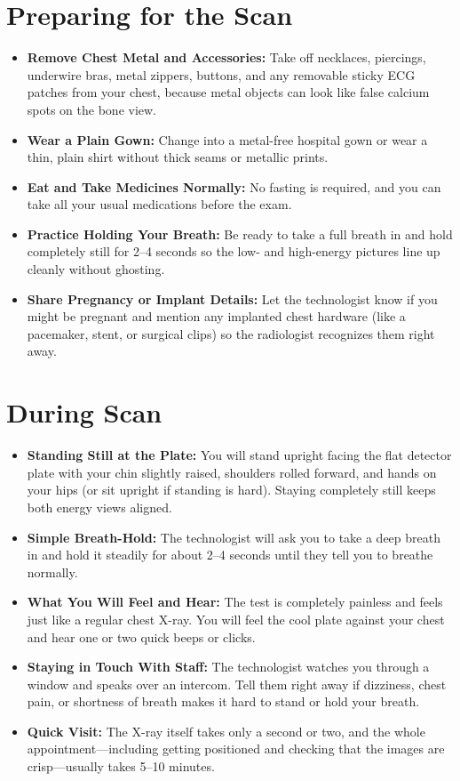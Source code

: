 \section{Preparing for the Scan}
\begin{itemize}
    \item \textbf{Remove Chest Metal and Accessories:} Take off necklaces, piercings, underwire bras, metal zippers, buttons, and any removable sticky ECG patches from your chest, because metal objects can look like false calcium spots on the bone view.
    \item \textbf{Wear a Plain Gown:} Change into a metal-free hospital gown or wear a thin, plain shirt without thick seams or metallic prints.
    \item \textbf{Eat and Take Medicines Normally:} No fasting is required, and you can take all your usual medications before the exam.
    \item \textbf{Practice Holding Your Breath:} Be ready to take a full breath in and hold completely still for 2--4 seconds so the low- and high-energy pictures line up cleanly without ghosting.
    \item \textbf{Share Pregnancy or Implant Details:} Let the technologist know if you might be pregnant and mention any implanted chest hardware (like a pacemaker, stent, or surgical clips) so the radiologist recognizes them right away.
\end{itemize}

\section{During Scan}
\begin{itemize}
    \item \textbf{Standing Still at the Plate:} You will stand upright facing the flat detector plate with your chin slightly raised, shoulders rolled forward, and hands on your hips (or sit upright if standing is hard). Staying completely still keeps both energy views aligned.
    \item \textbf{Simple Breath-Hold:} The technologist will ask you to take a deep breath in and hold it steadily for about 2--4 seconds until they tell you to breathe normally.
    \item \textbf{What You Will Feel and Hear:} The test is completely painless and feels just like a regular chest X-ray. You will feel the cool plate against your chest and hear one or two quick beeps or clicks.
    \item \textbf{Staying in Touch With Staff:} The technologist watches you through a window and speaks over an intercom. Tell them right away if dizziness, chest pain, or shortness of breath makes it hard to stand or hold your breath.
    \item \textbf{Quick Visit:} The X-ray itself takes only a second or two, and the whole appointment---including getting positioned and checking that the images are crisp---usually takes 5--10 minutes.
\end{itemize}

